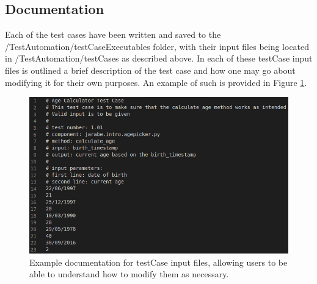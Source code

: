 \documentclass{article}
\begin{document}
\subsection{Documentation}
Each of the test cases have been written and saved to the /TestAutomation/testCaseExecutables folder, with their input files being located in /TestAutomation/testCases as described above. In each of these testCase input files is outlined a brief description of the test case and how one may go about modifying it for their own purposes. An example of such is provided in Figure \ref{Figure3}.
\begin{figure}
\centering
\includegraphics[scale=0.4]{../imgs/Figure3.png}
\caption{Example documentation for testCase input files, allowing users to be able to understand how to modify them as necessary.}
\label{Figure3}
\end{figure}
\end{document}
